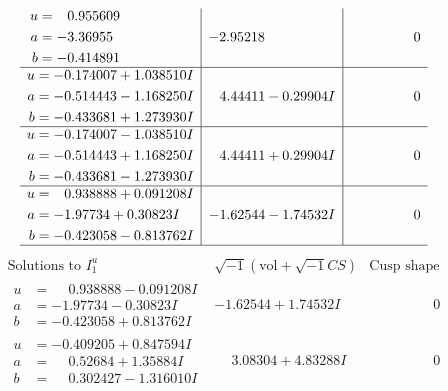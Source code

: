 \documentclass[1p]{elsarticle_modified}
\theoremstyle{definition}
\newcommand{\I}{\sqrt{-1}}
\begin{document}
$$\begin{array}{c|c|c}
\begin{aligned}
u &= \phantom{-}0.955609\phantom{ +0.000000I} \\
a &= -3.36955\phantom{ +0.000000I} \\
b &= -0.414891\phantom{ +0.000000I}\end{aligned}
 & -2.95218\phantom{ +0.000000I} & \phantom{-0.000000 } 0 \\ \hline\begin{aligned}
u &= -0.174007 + 1.038510 I \\
a &= -0.514443 - 1.168250 I \\
b &= -0.433681 + 1.273930 I\end{aligned}
 & \phantom{-}4.44411 - 0.29904 I & \phantom{-0.000000 } 0 \\ \hline\begin{aligned}
u &= -0.174007 - 1.038510 I \\
a &= -0.514443 + 1.168250 I \\
b &= -0.433681 - 1.273930 I\end{aligned}
 & \phantom{-}4.44411 + 0.29904 I & \phantom{-0.000000 } 0 \\ \hline\begin{aligned}
u &= \phantom{-}0.938888 + 0.091208 I \\
a &= -1.97734 + 0.30823 I \\
b &= -0.423058 - 0.813762 I\end{aligned}
 & -1.62544 - 1.74532 I & \phantom{-0.000000 } 0\\
 \hline 
 \end{array}$$\newpage$$\begin{array}{c|c|c}  
\text{Solutions to }I^u_{1}& \I (\text{vol} + \sqrt{-1}CS) & \text{Cusp shape}\\
 \hline 
\begin{aligned}
u &= \phantom{-}0.938888 - 0.091208 I \\
a &= -1.97734 - 0.30823 I \\
b &= -0.423058 + 0.813762 I\end{aligned}
 & -1.62544 + 1.74532 I & \phantom{-0.000000 } 0 \\ \hline\begin{aligned}
u &= -0.409205 + 0.847594 I \\
a &= \phantom{-}0.52684 + 1.35884 I \\
b &= \phantom{-}0.302427 - 1.316010 I\end{aligned}
 & \phantom{-}3.08304 + 4.83288 I & \phantom{-0.000000 } 0 \\ \hline\begin{aligned}

\end{aligned}
\end{array}$$
\end{document}
